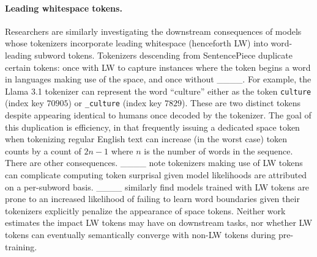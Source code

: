 \paragraph{Leading whitespace tokens.}
Researchers are similarly investigating the downstream consequences of models whose tokenizers incorporate leading whitespace (henceforth LW) into word-leading subword tokens.
Tokenizers descending from SentencePiece duplicate certain tokens: once with LW to capture instances where the token begins a word in languages making use of the space, and once without ____.
For example, the Llama 3.1 tokenizer can represent the word ``culture'' either as the token \verb.culture. (index key $70905$) or \verb._culture. (index key $7829$).
These are two distinct tokens despite appearing identical to humans once decoded by the tokenizer.
The goal of this duplication is efficiency, in that frequently issuing a dedicated space token when tokenizing regular English text can increase (in the worst case) token counts by a count of $2n-1$ where $n$ is the number of words in the sequence.
There are other consequences. ____ note tokenizers making use of LW tokens can complicate computing token surprisal given model likelihoods are attributed on a per-subword basis.
____ similarly find models trained with LW tokens are prone to an increased likelihood of failing to learn word boundaries given their tokenizers explicitly penalize the appearance of space tokens.
Neither work estimates the impact LW tokens may have on downstream tasks, nor whether LW tokens can eventually semantically converge with non-LW tokens during pre-training.